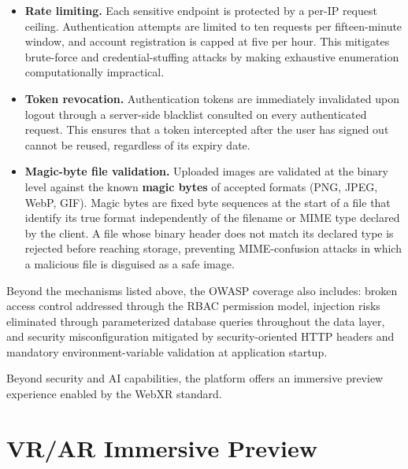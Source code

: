 \begin{itemize}[leftmargin=2em, itemsep=6pt]
  \item \textbf{Rate limiting.}
        Each sensitive endpoint is protected by a per-IP request ceiling. Authentication
        attempts are limited to ten requests per fifteen-minute window, and account
        registration is capped at five per hour. This mitigates brute-force and
        credential-stuffing attacks by making exhaustive enumeration computationally
        impractical.

  \item \textbf{Token revocation.}
        Authentication tokens are immediately invalidated upon logout through a
        server-side blacklist consulted on every authenticated request. This ensures
        that a token intercepted after the user has signed out cannot be reused,
        regardless of its expiry date.

  \item \textbf{Magic-byte file validation.}
        Uploaded images are validated at the binary level against the known
        \textbf{magic bytes} of accepted formats (PNG, JPEG, WebP, GIF). Magic bytes
        are fixed byte sequences at the start of a file that identify its true format
        independently of the filename or MIME type declared by the client. A file
        whose binary header does not match its declared type is rejected before
        reaching storage, preventing MIME-confusion attacks in which a malicious file
        is disguised as a safe image.
\end{itemize}



Beyond the mechanisms listed above, the OWASP coverage also includes: broken access control addressed through the RBAC permission model, injection risks eliminated through parameterized database queries throughout the data layer, and security misconfiguration mitigated by security-oriented HTTP headers and mandatory environment-variable validation at application startup.

Beyond security and AI capabilities, the platform offers an immersive preview experience enabled by the WebXR standard.

\section{VR/AR Immersive Preview}

